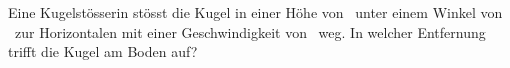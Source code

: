 Eine Kugelstösserin stösst die Kugel in einer Höhe von \hkO\ unter einem Winkel von \alO\ zur Horizontalen mit einer Geschwindigkeit von \vkO\ weg. In welcher Entfernung trifft die Kugel am Boden auf?
